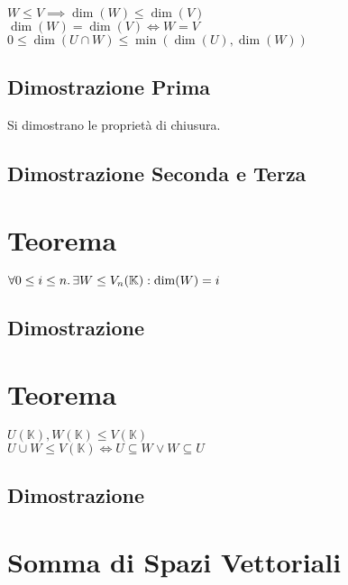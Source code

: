\documentclass[a4paper, twoside, italian, 11pt]{book}
\newcommand{\K}{\mathbb K}
\begin{document}
$W \leq V \implies \dim(W) \leq \dim(V)$ \\
$\dim(W) = \dim(V) \iff W = V$ \\

\noindent
$0 \leq \dim(U \cap W) \leq \min(\dim(U), \dim(W))$

\subsection{Dimostrazione Prima}


Si dimostrano le proprietà di chiusura.


\subsection{Dimostrazione Seconda e Terza}




\section{Teorema}

$\forall 0 \leq i \leq n \ldotp \exists W \leq V_n(\K) : \dim(W) = i$


\subsection {Dimostrazione}




\section{Teorema}

$U(\K), W(\K) \leq V(\K)$ \\

\noindent
$U \cup W  \leq V(\K) \iff U \subseteq W \lor W \subseteq U$


\subsection{Dimostrazione}




\section{Somma di Spazi Vettoriali}
\end{document}

